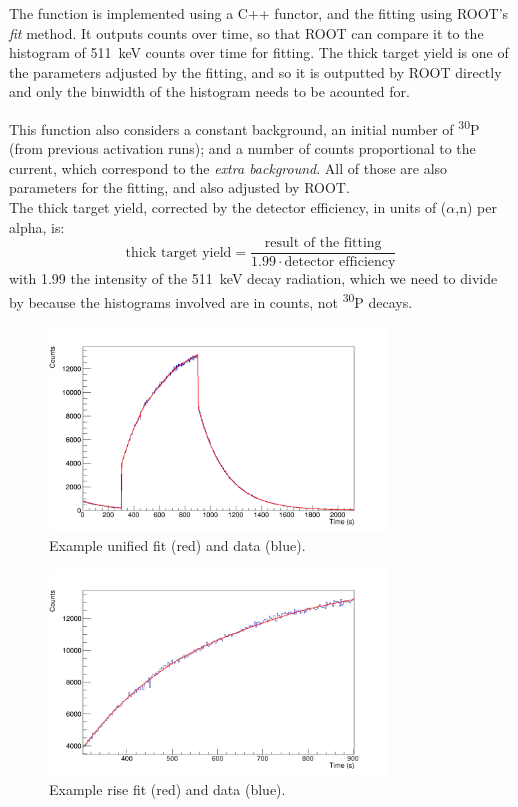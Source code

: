 \documentclass[a4paper,12pt]{report}
\newcommand{\an}{($\alpha$,n) }
\newcommand{\Piso}{\textsuperscript{30}P }
\begin{document}
The function is implemented using a C++ functor, and the fitting using ROOT's \textit{fit} method.
It outputs counts over time, so that ROOT can compare it to the histogram of \qty{511}{\keV} counts over time for fitting.
The thick target yield is one of the parameters adjusted by the fitting, and so it is outputted by ROOT directly and only the binwidth of the histogram needs to be acounted for.

This function also considers a constant background, an initial number of \Piso (from previous activation runs); and a number of counts proportional to the current, which correspond to the \textit{extra background}.
All of those are also parameters for the fitting, and also adjusted by ROOT.
\\

The thick target yield, corrected by the detector efficiency, in units of \an per alpha, is:
\begin{equation}
	\text{thick target yield} = \frac{\text{result of the fitting}}{1.99 \cdot \text{detector efficiency}}
\end{equation}
with \num{1.99} the intensity of the \qty{511}{\keV} decay radiation, which we need to divide by because the histograms involved are in counts, not \Piso decays.

\begin{figure}[H]
	\centering
	\includegraphics[width=0.80\textwidth]{example_unified_fit.png}
	\caption{Example unified fit (red) and data (blue).}
	\label{example_unified_fit}
\end{figure}

\begin{figure}[H]
	\centering
	\includegraphics[width=0.80\textwidth]{example_rise_fit.png}
	\caption{Example rise fit (red) and data (blue).}
	\label{example_rise_fit}
\end{figure}
\end{document}

